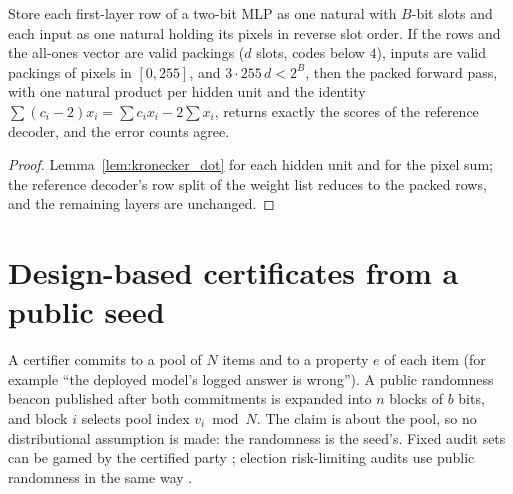 \begin{theorem}\label{thm:packed_mlp_inference}
\leanok
{}
Store each first-layer row of a two-bit MLP as one natural with $B$-bit slots
and each input as one natural holding its pixels in reverse slot order. If the
rows and the all-ones vector are valid packings ($d$ slots, codes below $4$),
inputs are valid packings of pixels in $[0,255]$, and $3\cdot255\,d<2^B$, then
the packed forward pass, with one natural product per hidden unit and the
identity $\sum(c_i-2)x_i=\sum c_ix_i-2\sum x_i$, returns exactly the scores of
the reference decoder, and the error counts agree.
\end{theorem}
\begin{proof}
\leanok
Lemma~\ref{lem:kronecker_dot} for each hidden unit and for the pixel sum; the
reference decoder's row split of the weight list reduces to the packed rows,
and the remaining layers are unchanged.
\end{proof}

\chapter{Design-based certificates from a public seed}

A certifier commits to a pool of $N$ items and to a property $e$ of each item
(for example ``the deployed model's logged answer is wrong''). A public
randomness beacon published after both commitments is expanded into $n$ blocks
of $b$ bits, and block $i$ selects pool index $v_i \bmod N$. The claim is about
the pool, so no distributional assumption is made: the randomness is the seed's. Fixed audit
sets can be gamed by the certified party \cite{luck2026certified}; election risk-limiting audits
use public randomness in the same way \cite{lindeman2012gentle}.

